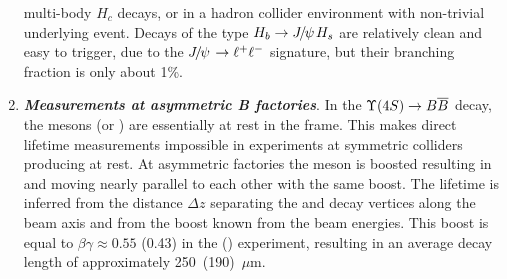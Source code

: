 \begin{enumerate}
  multi-body $H_c$ decays, or in a hadron collider environment with
  non-trivial underlying event.  Decays of the type $H_b\to {J\mskip -3mu/\mskip -2mu\psi\mskip 2mu} H_s$ are
  relatively clean and easy to trigger, due to the ${J\mskip -3mu/\mskip -2mu\psi\mskip 2mu}\to \ell^+\ell^-$
  signature, but their branching fraction is only about 1\%.
\item {\bf\em Measurements at asymmetric B factories}. 
  In the $\Ups\rightarrow B \bar{B}$ decay, the \B mesons (\Bu or \Bd) are
essentially at rest in the \Ups frame.  This makes direct lifetime
measurements impossible in experiments at symmetric colliders producing 
\Ups at rest. 
At asymmetric \B factories the \Ups meson is boosted
resulting in \B and  moving nearly parallel to each 
other with the same boost. The lifetime is inferred from the distance $\Delta z$        
separating the \B and  decay vertices along the beam axis 
and from the \Ups boost known from the beam energies. This boost is equal to 
$\beta \gamma \approx 0.55$ (0.43) in the \babar (\belle) experiment,
resulting in an average \B decay length of approximately 250~(190)~$\mu$m. 



\end{enumerate}
